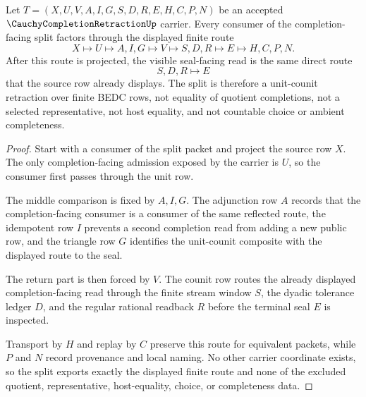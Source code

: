 \begin{theorem}
\label{thm:cauchy-completion-retraction-unit-counit-split}
Let $T=(X,U,V,A,I,G,S,D,R,E,H,C,P,N)$ be an accepted $\CauchyCompletionRetractionUp$ carrier. Every consumer of the completion-facing split factors through the displayed finite route
$$
X\longmapsto U\longmapsto A,I,G\longmapsto V\longmapsto S,D,R\longmapsto E\longmapsto H,C,P,N .
$$
After this route is projected, the visible seal-facing read is the same direct route
$$
S,D,R\longmapsto E
$$
that the source row already displays. The split is therefore a unit-counit retraction over finite BEDC rows, not equality of quotient completions, not a selected representative, not host equality, and not countable choice or ambient completeness.
\end{theorem}
\begin{proof}
Start with a consumer of the split packet and project the source row $X$. The only completion-facing admission exposed by the carrier is $U$, so the consumer first passes through the unit row.

The middle comparison is fixed by $A,I,G$. The adjunction row $A$ records that the completion-facing consumer is a consumer of the same reflected route, the idempotent row $I$ prevents a second completion read from adding a new public row, and the triangle row $G$ identifies the unit-counit composite with the displayed route to the seal.

The return part is then forced by $V$. The counit row routes the already displayed completion-facing read through the finite stream window $S$, the dyadic tolerance ledger $D$, and the regular rational readback $R$ before the terminal seal $E$ is inspected.

Transport by $H$ and replay by $C$ preserve this route for equivalent packets, while $P$ and $N$ record provenance and local naming. No other carrier coordinate exists, so the split exports exactly the displayed finite route and none of the excluded quotient, representative, host-equality, choice, or completeness data.
\end{proof}

